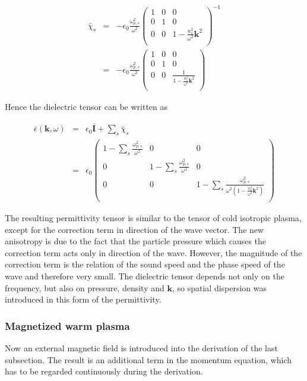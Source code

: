 \documentclass[a4paper,11pt]{thesis}
\begin{document}
\begin{eqnarray}
   \bar{\chi}_s &=& - \epsilon_0 \frac{\omega_{p,s}^2}{  \omega^2} \left(%
\begin{array}{ccc}
  1 & 0 & 0 \\
  0 & 1 & 0 \\
  0 & 0 & 1-  \frac{u_s^2 }{  \omega^2}\mathbf{k}^2 \\
\end{array}%
\right)^{-1}\\
&=& - \epsilon_0 \frac{\omega_{p,s}^2}{  \omega^2} \left(%
\begin{array}{ccc}
  1 & 0 & 0 \\
  0 & 1 & 0 \\
  0 & 0 & \frac{1}{1-  \frac{u_s^2 }{  \omega^2}\mathbf{k}^2} \\
\end{array}%
\right)
\end{eqnarray}

Hence the dielectric tensor can be written as

\begin{eqnarray}
    \bar{\epsilon}(\mathbf{k},\omega)&=& \epsilon_0 \bar{\mathbf{I}}+ \sum_s \bar{\chi}_s \\
    &=& \epsilon_0 \left(%
\begin{array}{ccc}
  1- \sum_s \frac{\omega_{p,s}^2}{  \omega^2} & 0 & 0 \\
  0 & 1- \sum_s \frac{\omega_{p,s}^2}{  \omega^2} & 0 \\
  0 & 0 & 1- \sum_s \frac{ \omega_{p,s}^2}{\omega^2 \left( 1-  \frac{u_s^2 }{  \omega^2}\mathbf{k}^2\right)} \\
\end{array}%
\right)\nonumber
\end{eqnarray}

The resulting permittivity tensor is similar to the tensor of cold isotropic plasma, except for the correction term in direction of the wave vector. The new anisotropy is due to the fact that the particle pressure which causes the correction term acts only in direction of the wave. However, the magnitude of the correction term is the relation of the sound speed and the phase speed of the wave and therefore very small. The dielectric tensor depends not only on the frequency, but also on pressure, density and $\mathbf{k}$, so spatial dispersion was introduced in this form of the permittivity.


\subsubsection{Magnetized warm plasma}
Now an external magnetic field is introduced into the derivation of the last subsection. The result is an additional term in the momentum equation, which has to be regarded continuously during the derivation.
\end{document}

